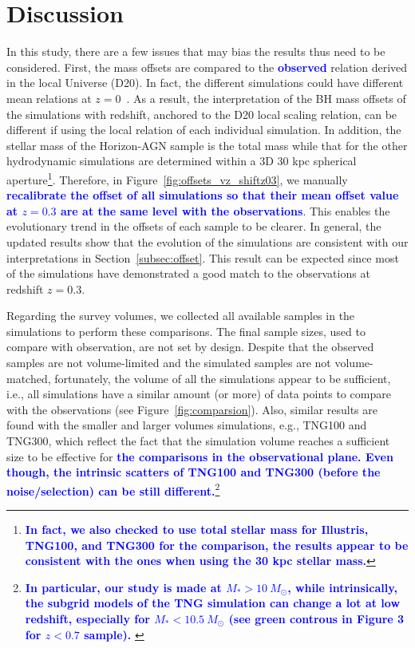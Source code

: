 \documentclass[twocolumn]{aastex631}
\newcommand{\blue}[1]{\textcolor{blue}{\bf #1}}
\def\smass{{$M_*$}}
\begin{document}
\section{Discussion} \label{sec:dis}
In this study, there are a few issues that may bias the results thus need to be considered. First, the mass offsets are compared to the \blue{observed} relation derived in the local Universe (D20). In fact, the different simulations could have different mean relations at $z=0$~\citep[e.g.,][]{Habouzit2021}. As a result, the interpretation of the BH mass offsets of the simulations with redshift, anchored to the D20 local scaling relation, can be different if using the local relation of each individual simulation. In addition, the stellar mass of the Horizon-AGN sample is the total mass while that for the other hydrodynamic simulations are determined within a 3D 30 kpc spherical aperture\footnote{\blue{In fact, we also checked to use total stellar mass for Illustris, TNG100, and TNG300 for the comparison, the results appear to be consistent with the ones when using the 30 kpc stellar mass.}}. Therefore, in Figure~\ref{fig:offsets_vz_shiftz03}, we manually \blue{recalibrate the offset of all simulations so that their mean offset value  at $z=0.3$ are at the same level with the observations}. This enables the evolutionary trend in the offsets of each sample to be clearer. In general, the updated results show that the evolution of the simulations are consistent with our interpretations in Section~\ref{subsec:offset}. This result can be expected since most of the simulations have demonstrated a good match to the observations at redshift $z=0.3$.

Regarding the survey volumes, we collected all available samples in the simulations to perform these comparisons. The final sample sizes, used to compare with observation, are not set by design. Despite that the observed samples are not volume-limited and the simulated samples are not volume-matched, fortunately, the volume of all the simulations appear to be sufficient, i.e., all simulations have a similar amount (or more) of data points to compare with the observations (see Figure~\ref{fig:comparsion}). Also, similar results are found with the smaller and larger volumes simulations, e.g., TNG100 and TNG300, which reflect the fact that the simulation volume reaches a sufficient size to be effective for \blue{the comparisons in the observational plane. Even though, the intrinsic scatters of TNG100 and TNG300 (before the noise/selection) can be still different.}\footnote{\blue{In particular, our study is made at \smass$>10~M_{\odot}$, while intrinsically, the subgrid models of the TNG simulation can change a lot at low redshift, especially for \smass$<10.5~M_{\odot}$ (see green controus in Figure 3 for $z<0.7$ sample). }}
\end{document}
